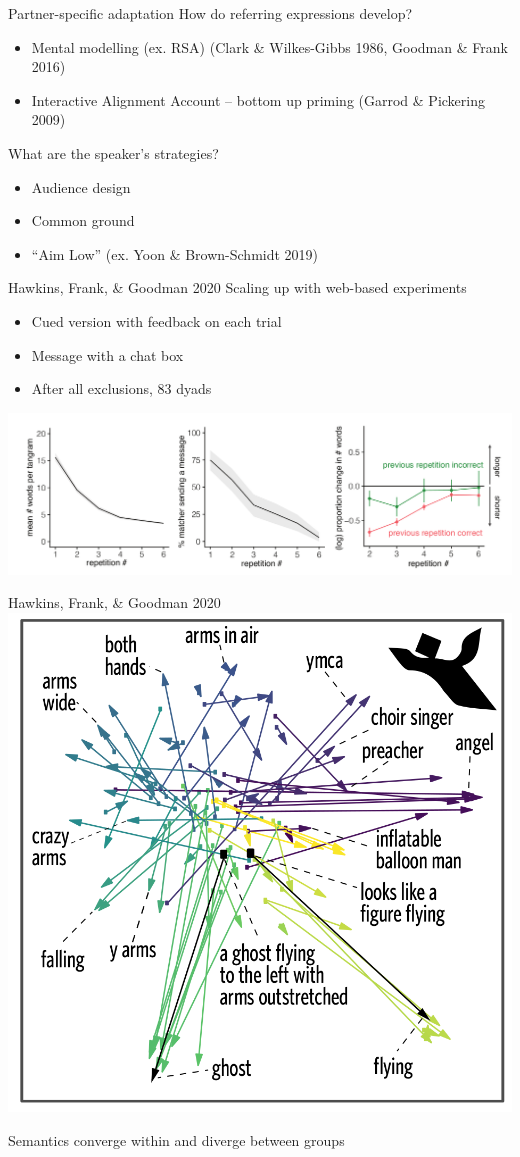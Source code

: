 \documentclass[ 12pt, xcolor=beamer,table,usenames,dvipsnames, ignorenonframetext, ngerman]{beamer}
\begin{document}
\begin{frame}{Partner-specific adaptation}\pause
		How do referring expressions develop?\pause
			\begin{itemize} 
		\item Mental modelling (ex. RSA) (Clark \& Wilkes-Gibbs 1986, Goodman \& Frank 2016) \pause
		\item Interactive Alignment Account -- bottom up priming (Garrod \& Pickering 2009)
	\end{itemize}\pause
	What are the speaker's strategies? \pause
	\begin{itemize}
		\item Audience design
		\item Common ground
		\item ``Aim Low'' (ex. Yoon \& Brown-Schmidt 2019)
	\end{itemize}

\end{frame}

%


%
\begin{frame}{Hawkins, Frank, \& Goodman 2020}
Scaling up with web-based experiments
\begin{itemize}
	\item Cued version with feedback on each trial \pause
	\item Message with a chat box \pause
	\item After all exclusions, 83 dyads \pause
\end{itemize}
\includegraphics[width=\textwidth]{../images/hawkins_fewer_words.png}
\end{frame}
%


\begin{frame}{Hawkins, Frank, \& Goodman 2020}
	\includegraphics[width=.6\textwidth]{../images/hawkins_semantics.png}
	
	Semantics converge within and diverge between groups
\end{frame}
\end{document}
